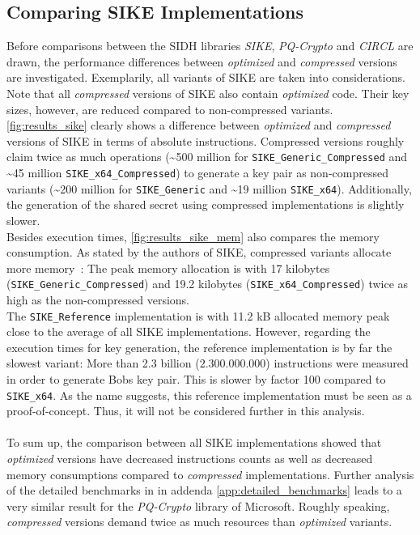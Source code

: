 \subsection{Comparing SIKE Implementations}\label{sec:analysis_sike}
Before comparisons between the SIDH libraries \textit{SIKE}, \textit{PQ-Crypto} and \textit{CIRCL} are drawn, the performance differences between \textit{optimized} and \textit{compressed} versions are investigated. Exemplarily, all variants of SIKE are taken into considerations. Note that all \textit{compressed} versions of SIKE also contain \textit{optimized} code. Their key sizes, however, are reduced compared to non-compressed variants.
\\
\autoref{fig:results_sike} clearly shows a difference between \textit{optimized} and \textit{compressed} versions of SIKE in terms of absolute instructions. Compressed versions roughly claim twice as much operations (\textasciitilde 500 million for \texttt{SIKE\_Generic\_Compressed} and \textasciitilde 45 million \texttt{SIKE\_x64\_Compressed}) to generate a key pair as non-compressed variants (\textasciitilde 200 million for \texttt{SIKE\_Generic} and \textasciitilde 19 million \texttt{SIKE\_x64}). Additionally, the generation of the shared secret  using compressed implementations is slightly slower.\\
Besides execution times, \autoref{fig:results_sike_mem} also compares the memory consumption. As stated by the authors of SIKE, compressed variants allocate more memory~\parencite{sike2020spec}: The peak memory allocation is with 17 kilobytes (\texttt{SIKE\_Generic\_Compressed}) and 19.2 kilobytes (\texttt{SIKE\_x64\_Compressed}) twice as high as the non-compressed versions.\\
The \texttt{SIKE\_Reference} implementation is with 11.2 kB allocated memory peak close to the average of all SIKE implementations. However, regarding the execution times for key generation, the reference implementation is by far the slowest variant: More than 2.3 billion ($2.300.000.000$) instructions were measured in order to generate Bobs key pair. This is slower by factor 100 compared to \texttt{SIKE\_x64}. As the name suggests, this reference implementation must be seen as a proof-of-concept. Thus, it will not be considered further in this analysis.
\\\\
To sum up, the comparison between all SIKE implementations showed that \textit{optimized} versions have decreased instructions counts as well as decreased memory consumptions compared to \textit{compressed} implementations. Further analysis of the detailed benchmarks in in addenda \ref{app:detailed_benchmarks} leads to a very similar result for the \textit{PQ-Crypto} library of Microsoft. Roughly speaking, \textit{compressed} versions demand twice as much resources than \textit{optimized} variants.

